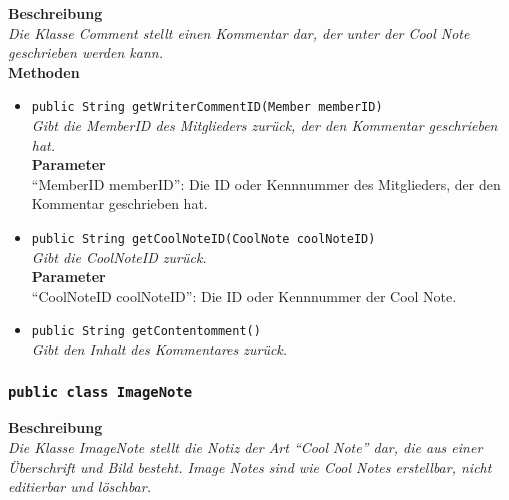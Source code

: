 	\textbf{Beschreibung} \\
	\textit{Die Klasse Comment stellt einen Kommentar dar, der unter der Cool Note geschrieben werden kann.} \\
	
	\textbf{Methoden}
	\begin{itemize}
		\item\texttt{{public String getWriterCommentID(Member memberID)}}\\
		\textit{Gibt die MemberID des Mitglieders zurück, der den Kommentar geschrieben hat.}\\
		\textbf{Parameter}\\
		“MemberID memberID”: Die ID oder Kennnummer des Mitglieders, der den Kommentar geschrieben hat.\\
		
		\item\texttt{{public String getCoolNoteID(CoolNote coolNoteID)}}\\
		\textit{Gibt die CoolNoteID zurück.}\\
		\textbf{Parameter}\\
		“CoolNoteID coolNoteID”: Die ID oder Kennnummer der Cool Note.\\
		
		\item\texttt{{public String getContentomment()}}\\
		\textit{Gibt den Inhalt des Kommentares zurück.}\\
	\end{itemize}

\subsubsection{\texttt{public class ImageNote}}

	\textbf{Beschreibung} \\
	\textit{Die Klasse ImageNote stellt die Notiz der Art “Cool Note” dar, die aus einer Überschrift und Bild besteht. Image Notes sind wie Cool Notes erstellbar, nicht editierbar und löschbar.} \\
	
